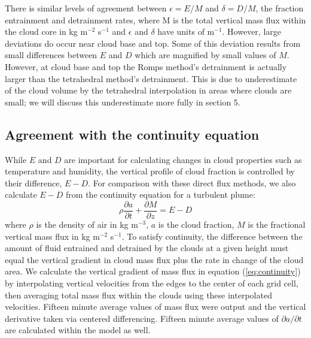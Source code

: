 \documentclass[12pt]{article}
\begin{document}
There is similar levels of agreement between $\epsilon = E/M$ and 
$\delta = D/M$, the fraction entrainment and detrainment rates, where M is the 
total vertical mass flux within the cloud core in kg m$^{-2}$ s$^{-1}$ and 
$\epsilon$ and $\delta$ have units of m$^{-1}$.  However, large deviations do 
occur near cloud base and top. Some of this deviation results from small 
differences between $E$ and $D$ which are magnified by small values of $M$.  
However, at cloud base and top the Romps method's detrainment is actually 
larger than the tetrahedral method's detrainment.  This is due to underestimate 
of the cloud volume by the tetrahedral interpolation in areas where clouds are 
small; we will discuss this underestimate more fully in section 5.  

\subsection{Agreement with the continuity equation}

While $E$ and $D$ are important for calculating changes in cloud properties 
such as temperature and humidity, the vertical profile of cloud fraction is
controlled by their difference, $E-D$.  For comparison with these direct 
flux methods, we also calculate $E-D$ from the continuity equation for a 
turbulent plume: 
\begin{equation}
    \label{eq:continuity}
    \rho \frac{\partial a}{\partial t} 
    + \frac{\partial M}{\partial z}
    = E - D
\end{equation}
where $\rho$ is the density of air in kg m$^{-3}$, $a$ is the cloud fraction, 
$M$ is the fractional vertical mass flux in kg m$^{-2}$ s$^{-1}$.  To satisfy 
continuity, the difference between the amount of fluid entrained and detrained 
by the clouds at a given height must equal the vertical gradient in cloud mass 
flux plus the rate in change of the cloud area.  We calculate the vertical 
gradient of mass flux in equation (\ref{eq:continuity}) by interpolating 
vertical velocities from the edges to the center of each grid cell, then 
averaging total mass flux within the clouds using these interpolated velocities.  
Fifteen minute average values of mass flux were output and the vertical 
derivative taken via centered differencing.  Fifteen minute average values of 
$\partial a/\partial t$ are calculated within the model as well.  
\end{document}
